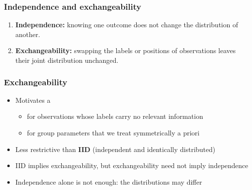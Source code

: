 \documentclass[10pt]{beamer}
\begin{document}
\begin{frame}
\frametitle{Independence and exchangeability}

  \begin{enumerate}
  \item \textbf{Independence:} knowing one outcome does not change the
    distribution of another.
  \item \textbf{Exchangeability:} swapping the labels or positions of
    observations leaves their joint distribution unchanged.
  \end{enumerate}
\end{frame}




\begin{frame}

\frametitle{Exchangeability}

  \begin{itemize}
  \item Motivates a 
    \begin{itemize}
    \item for observations whose labels carry no relevant information
    \item for group parameters that we treat symmetrically a priori
    \end{itemize}
  \item Less restrictive than \textbf{IID}
    (independent and identically distributed)
  \item IID implies exchangeability, but exchangeability need not
    imply independence
  \item Independence alone is not enough: the distributions may differ
  \end{itemize}
\end{frame}
\end{document}
